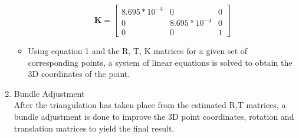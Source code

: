 \documentclass{article}
\begin{document}
\begin{enumerate}
\begin{itemize}
					\begin{equation}
						\mathbf{K} = \begin{bmatrix} 8.695*10^{-4} & 0 & 0 \\
						0 & 8.695*10^{-4} & 0 \\ 0 & 0 & 1 \end{bmatrix} 
					\end{equation}
				\item Using equation 1 and the R, T, K matrices for a given set of corresponding points, a system of linear equations is solved to obtain the 3D coordinates of the point.   
			\end{itemize}
		\item Bundle Adjustment \\
			After the triangulation has taken place from the estimated R,T matrices, a bundle adjustment is done to improve the 3D point coordinates, rotation and translation matrices to yield the final result. 
		\end{enumerate}
\end{document}
